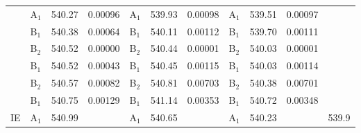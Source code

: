 \documentclass[journal=jctcce,manuscript=article]{achemso}
\begin{document}
\begin{table}[H]
\begin{tabular}{l|lcc|lcc|lcc|l}
& A$_1$ & 540.27 & 0.00096 & A$_1$ & 539.93 & 0.00098 & A$_1$ & 539.51 & 0.00097 \\
& B$_1$ & 540.38 & 0.00064 & B$_1$ & 540.11 & 0.00112 & B$_1$ & 539.70 & 0.00111 \\
& B$_2$ & 540.52 & 0.00000 & B$_2$ & 540.44 & 0.00001 & B$_2$ & 540.03 & 0.00001 \\
& B$_1$ & 540.52 & 0.00043 & B$_1$ & 540.45 & 0.00115 & B$_1$ & 540.03 & 0.00114 \\
& B$_2$ & 540.57 & 0.00082 & B$_2$ & 540.81 & 0.00703 & B$_2$ & 540.38 & 0.00701 \\
& B$_1$ & 540.75 & 0.00129 & B$_1$ & 541.14 & 0.00353 & B$_1$ & 540.72 & 0.00348 \\
\hline
IE
& A$_1$ & 540.99 &        
& A$_1$ & 540.65 & 
& A$_1$ & 540.23 &
        & 539.9\cite{jolly1984core}  \\
\hline
\end{tabular}
\end{table}
\end{document}
